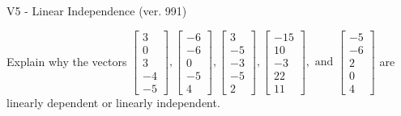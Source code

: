 \begin{exercise}
  \begin{exerciseTitle}V5 - Linear Independence (ver. 991)\end{exerciseTitle}
  \begin{exerciseStatement}
    Explain why the vectors \(\left[\begin{array}{r}
3 \\
0 \\
3 \\
-4 \\
-5
\end{array}\right] , \left[\begin{array}{r}
-6 \\
-6 \\
0 \\
-5 \\
4
\end{array}\right] , \left[\begin{array}{r}
3 \\
-5 \\
-3 \\
-5 \\
2
\end{array}\right] , \left[\begin{array}{r}
-15 \\
10 \\
-3 \\
22 \\
11
\end{array}\right] , \text{ and } \left[\begin{array}{r}
-5 \\
-6 \\
2 \\
0 \\
4
\end{array}\right]\) are linearly dependent or linearly independent.	



\end{exerciseStatement}
\end{exercise}
